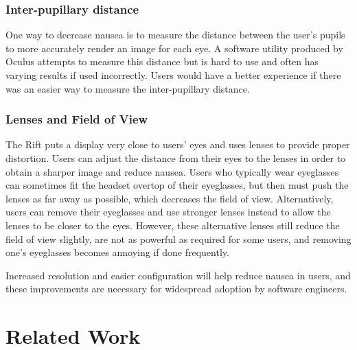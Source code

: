 \documentclass[conference]{IEEEtran}
\begin{document}
\subsubsection{Inter-pupillary distance}
One way to decrease nausea is to measure the distance between the user's pupils to more accurately render an image for each eye.
A software utility produced by Oculus attempts to measure this distance but is hard to use and often has varying results if used incorrectly.
Users would have a better experience if there was an easier way to measure the inter-pupillary distance.

\subsubsection{Lenses and Field of View}
The Rift puts a display very close to users' eyes and uses lenses to provide proper distortion.
Users can adjust the distance from their eyes to the lenses in order to obtain a sharper image and reduce nausea.
Users who typically wear eyeglasses can sometimes fit the headset overtop of their eyeglasses, but then must push the lenses as far away as possible, which decreases the field of view.
Alternatively, users can remove their eyeglasses and use stronger lenses instead to allow the lenses to be closer to the eyes.
However, these alternative lenses still reduce the field of view slightly, are not as powerful as required for some users, and removing one's eyeglasses becomes annoying if done frequently.

Increased resolution and easier configuration will help reduce nausea in users, and these improvements are necessary for widespread adoption by software engineers.



\section{Related Work}

\\

\end{document}
